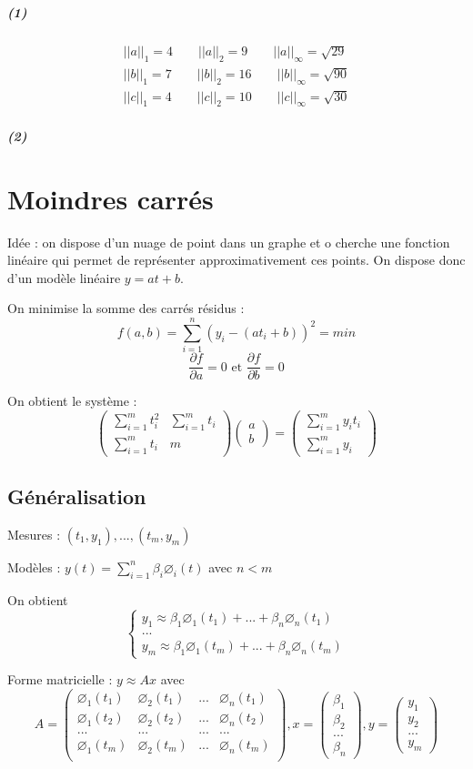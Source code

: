 \documentclass[a4paper,9pt]{extarticle}
\newcommand{\matd}[4]{\begin{pmatrix}#1 & #2 \\ #3 & #4\end{pmatrix}}
\newcommand{\matdd}[2]{\begin{pmatrix}#1 \\ #2\end{pmatrix}}
\newcommand{\matdddd}[4]{\begin{pmatrix}#1\\#2\\#3\\#4\end{pmatrix}}
\newcommand{\matnnn}[3]{\begin{matrix}#1 \\ #2 \\ #3\end{matrix}}
\newcommand{\partderiv}[2]{\frac{\partial #1}{\partial #2}}
\newcommand{\normun}[1]{||#1||_1}
\newcommand{\normdeux}[1]{||#1||_2}
\newcommand{\norminf}[1]{||#1||_{\infty}}
\begin{document}
\paragraph*{(1)}
\begin{align*}
\normun{a} = 4 \qquad \normdeux{a} = 9 \qquad \norminf{a} = \sqrt{29}\\
\normun{b} = 7 \qquad \normdeux{b} = 16 \qquad \norminf{b} = \sqrt{90}\\
\normun{c} = 4 \qquad \normdeux{c} = 10 \qquad \norminf{c} = \sqrt{30}
\end{align*}

\paragraph*{(2)}

\chapter{Moindres carrés}

Idée : on dispose d'un nuage de point dans un graphe et o cherche une fonction linéaire qui permet de représenter approximativement ces points. On dispose donc d'un modèle linéaire $y = at + b$.

On minimise la somme des carrés résidus :
$$ f(a,b) = \sum_{i=1}^n(y_i-(at_i+b))^2 = min $$
$$ \partderiv{f}{a} = 0 \text{ et } \partderiv{f}{b} = 0 $$

On obtient le système :
$$
\matd{\sum_{i=1}^m t_i^2}{\sum_{i=1}^m t_i}{\sum_{i=1}^m t_i}{m} \matdd{a}{b} =
\matdd{\sum_{i=1}^m y_it_i}{\sum_{i=1}^m y_i}
$$

\section{Généralisation}

Mesures : $(t_1,y_1),...,(t_m,y_m)$

Modèles : $y(t) = \sum_{i=1}^n \beta_i\varnothing_i(t)$ avec $n < m$

On obtient
$$
\left\lbrace
\matnnn{y_1 \approx \beta_1\varnothing_1(t_1) + ... + \beta_n\varnothing_n(t_1)}
       {...}
       {y_m \approx \beta_1\varnothing_1(t_m) + ... + \beta_n\varnothing_n(t_m)}
\right.
$$

Forme matricielle : $y \approx Ax$ avec 
$$
A =
\begin{pmatrix}
\varnothing_1(t_1) & \varnothing_2(t_1) & ... & \varnothing_n(t_1) \\
\varnothing_1(t_2) & \varnothing_2(t_2) & ... & \varnothing_n(t_2) \\
... & ... & ... & ... \\
\varnothing_1(t_m) & \varnothing_2(t_m) & ... & \varnothing_n(t_m) \\
\end{pmatrix} ,
x = \matdddd{\beta_1}{\beta_2}{...}{\beta_n},
y = \matdddd{y_1}{y_2}{...}{y_m}
$$
\end{document}
